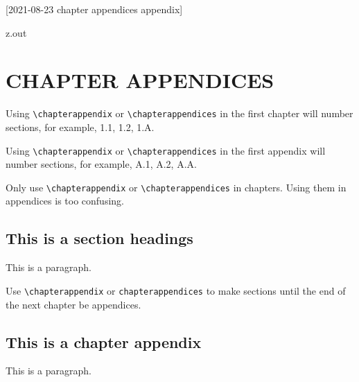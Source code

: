 [2021-08-23 chapter appendices appendix]

\begin{VerbatimOut}{z.out}
\chapter{CHAPTER APPENDICES}

Using \verb+\chapterappendix+ or \verb+\chapterappendices+
in the first chapter will number sections, for example,
1.1, 1.2, 1.A.

Using \verb+\chapterappendix+ or \verb+\chapterappendices+
in the first appendix will number sections, for example,
A.1, A.2, A.A.

Only use \verb+\chapterappendix+ or \verb+\chapterappendices+
in chapters.
Using them in appendices is too confusing.

\section{This is a section headings}

This is a paragraph.

Use \verb+\chapterappendix+ or \verb+chapterappendices+
to make sections until the end of the next chapter
be appendices.

\chapterappendix

\section{This is a chapter appendix}

This is a paragraph.
\end{VerbatimOut}

\MyIO
